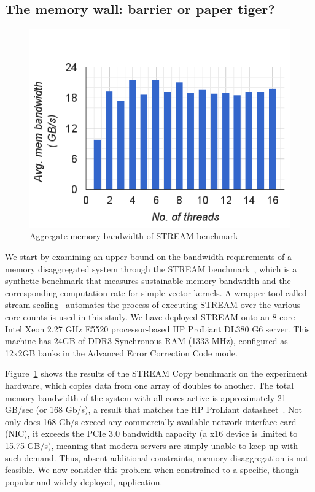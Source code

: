 \documentclass{sig-alternate-05-2015}
\begin{document}
\subsection{The memory wall: barrier or paper tiger?}
\label{sec:memory_wall}

\begin{figure}
\centering
\includegraphics[width=\columnwidth]{stream-bandwidth}
\caption{\label{fig:stream}Aggregate memory bandwidth of STREAM benchmark}
\end{figure}

We start by examining an upper-bound on the bandwidth requirements of a memory
disaggregated system through the STREAM benchmark~\cite{mccalpin1995stream},
which is a synthetic benchmark that measures sustainable memory bandwidth and
the corresponding computation rate for simple vector kernels. A wrapper tool
called stream-scaling~\cite{streamScaling} automates the process of executing
STREAM over the various core counts is used in this study.  We have deployed
STREAM onto an 8-core Intel Xeon 2.27 GHz E5520 processor-based HP ProLiant
DL380 G6 server.  This machine has 24GB of DDR3 Synchronous RAM (1333 MHz),
configured as 12x2GB banks in the Advanced Error Correction Code mode.

Figure~\ref{fig:stream} shows the results of the STREAM Copy benchmark on the
experiment hardware, which copies data from one array of doubles to another.
The total memory bandwidth of the system with all cores active is approximately
21 GB/sec (or 168 Gb/s), a result that matches the HP ProLiant
datasheet~\cite{hpProliant}.  Not only does 168 Gb/s exceed any commercially
available network interface card (NIC), it exceeds the PCIe 3.0 bandwidth
capacity (a x16 device is limited to 15.75 GB/s), meaning that modern servers
are simply unable to keep up with such demand.  Thus, absent additional
constraints, memory disaggregation is not feasible.  We now consider this
problem when constrained to a specific, though popular and widely deployed,
application.
\end{document}
